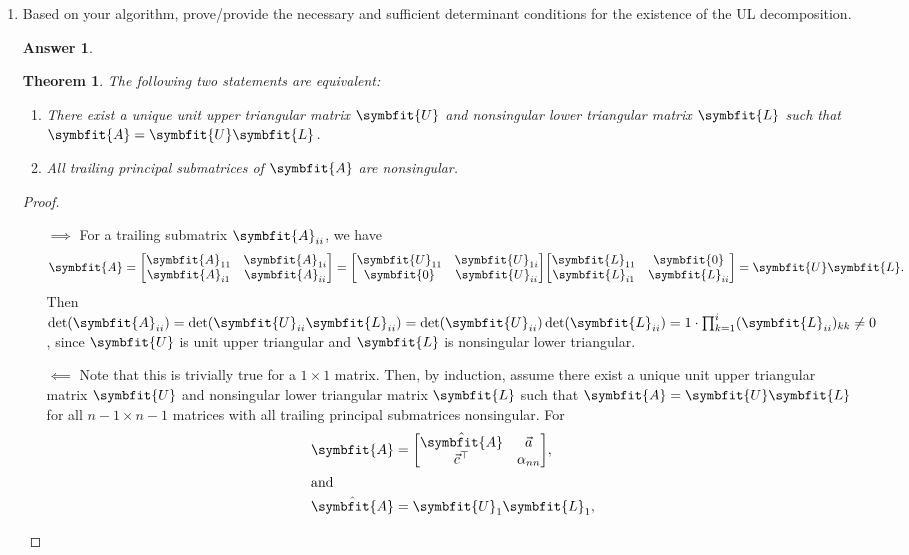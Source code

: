 \documentclass{article}
\newtheorem{theorem}{Theorem}
\theoremstyle{definition}
\newtheorem*{answer}{Answer}
\newcommand{\mat}[1]{\symbfit{#1}}
\begin{document}
\begin{enumerate}[leftmargin=\labelsep]
\begin{enumerate}
		      \item Based on your algorithm, prove/provide the necessary and sufficient determinant conditions for the existence of the UL decomposition.
		            \begin{answer}
			            \begin{theorem}
				            The following two statements are equivalent:
				            \begin{enumerate}
					            \item There exist a unique unit upper triangular matrix \(\mat{U}\) and nonsingular lower triangular matrix \(\mat{L}\) such that \(\mat{A} = \mat{U}\mat{L}\).
					            \item All trailing principal submatrices of \(\mat{A}\) are nonsingular.
				            \end{enumerate}
			            \end{theorem}
			            \begin{proof}\hfill
				            \begin{itemize}
					            \item[\(\implies\)] For a trailing submatrix \(\mat{A}_{ii}\), we have
						            \[
							            \mat{A} = \mqty[\mat{A}_{11}&\mat{A}_{1i}\\\mat{A}_{i1}&\mat{A}_{ii}] = \mqty[\mat{U}_{11}&\mat{U}_{1i}\\\mat{0}&\mat{U}_{ii}] \mqty[\mat{L}_{11}&\mat{0}\\\mat{L}_{i1}&\mat{L}_{ii}] = \mat{U}\mat{L}.
						            \]
						            Then \(\det(\mat{A}_{ii}) = \det(\mat{U}_{ii}\mat{L}_{ii}) = \det(\mat{U}_{ii})\det(\mat{L}_{ii}) = 1 \cdot \prod_{k=1}^i (\mat{L}_{ii})_{kk} \neq 0\), since \(\mat{U}\) is unit upper triangular and \(\mat{L}\) is nonsingular lower triangular.
					            \item[\(\impliedby\)] Note that this is trivially true for a \(1 \times 1\) matrix. Then, by induction, assume there exist a unique unit upper triangular matrix \(\mat{U}\) and nonsingular lower triangular matrix \(\mat{L}\) such that \(\mat{A} = \mat{U}\mat{L}\) for all \(n-1 \times n-1\) matrices with all trailing principal submatrices nonsingular. For
						            \begin{align*}
							            \mat{A}       & = \mqty[\hat{\mat{A}} & \vec{a} \\\vec{c}^\top & \alpha_{nn}],               \\
							            \shortintertext{and}
							            \hat{\mat{A}} & = \mat{U}_1\mat{L}_1,                                                        \\

\end{align*}
\end{itemize}
\end{proof}
\end{answer}
\end{enumerate}
\end{enumerate}
\end{document}
